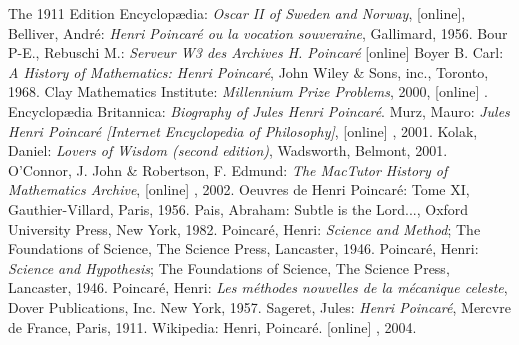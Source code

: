 \documentclass[12pt]{article}
\begin{document}
\begin{thebibliography}{99}
 The 1911 Edition Encyclop{\ae}dia: \textsl{Oscar II of Sweden and Norway}, [online], 
 Belliver, Andr\'e: \textsl{Henri Poincar\'e ou la vocation souveraine}, Gallimard, 1956.
 Bour P-E., Rebuschi M.: \textsl{Serveur W3 des Archives H. Poincar\'e} [online] 
 Boyer B. Carl: \textsl{A History of Mathematics: Henri Poincar\'e}, John Wiley \& Sons, inc., Toronto, 1968.
 Clay Mathematics Institute: \textsl{Millennium Prize Problems}, 2000, [online] .
 Encyclop{\ae}dia Britannica: \textsl{Biography of Jules Henri Poincar\'e}.
 Murz, Mauro: \textsl{Jules Henri Poincar\'e [Internet Encyclopedia of Philosophy]}, [online] , 2001.
 Kolak, Daniel: \textsl{Lovers of Wisdom (second edition)}, Wadsworth, Belmont, 2001.
 O'Connor, J. John \& Robertson, F. Edmund: \textsl{The MacTutor History of Mathematics Archive}, [online] , 2002.
 Oeuvres de Henri Poincar\'e: Tome XI, Gauthier-Villard, Paris, 1956.
 Pais, Abraham:  Subtle is the Lord..., Oxford University Press, New York, 1982.
 Poincar\'e, Henri: \textsl{Science and Method}; The Foundations of Science, The Science Press, Lancaster, 1946.
 Poincar\'e, Henri: \textsl{Science and Hypothesis}; The Foundations of Science, The Science Press, Lancaster, 1946.
 Poincar\'e, Henri: \textsl{Les m\'ethodes nouvelles de la m\'ecanique celeste}, Dover Publications, Inc. New York, 1957.
 Sageret, Jules: \textsl{Henri Poincar\'e}, Mercvre de France, Paris, 1911.
 Wikipedia: Henri, Poincar\'e. [online] , 2004.
\end{thebibliography}
\end{document}
